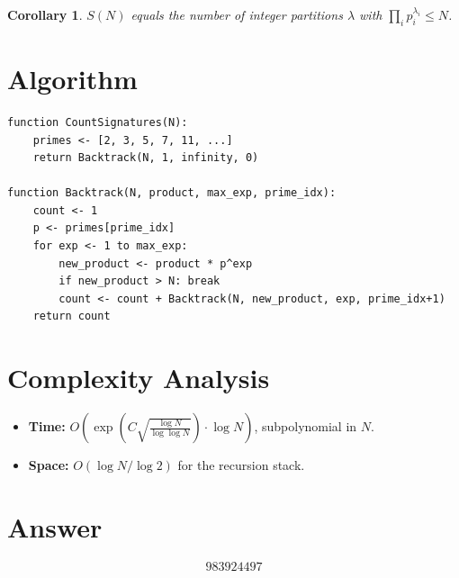 \documentclass[11pt]{article}
\newtheorem{corollary}[theorem]{Corollary}
\theoremstyle{definition}
\begin{document}
\begin{corollary}
$S(N)$ equals the number of integer partitions $\lambda$ with $\prod_i p_i^{\lambda_i} \le N$.
\end{corollary}

\section{Algorithm}

\begin{verbatim}
function CountSignatures(N):
    primes <- [2, 3, 5, 7, 11, ...]
    return Backtrack(N, 1, infinity, 0)

function Backtrack(N, product, max_exp, prime_idx):
    count <- 1
    p <- primes[prime_idx]
    for exp <- 1 to max_exp:
        new_product <- product * p^exp
        if new_product > N: break
        count <- count + Backtrack(N, new_product, exp, prime_idx+1)
    return count
\end{verbatim}

\section{Complexity Analysis}

\begin{itemize}
\item \textbf{Time:} $O\!\left(\exp\!\left(C\sqrt{\frac{\log N}{\log\log N}}\right) \cdot \log N\right)$, subpolynomial in $N$.
\item \textbf{Space:} $O(\log N / \log 2)$ for the recursion stack.
\end{itemize}

\section{Answer}

\[
\boxed{983924497}
\]
\end{document}
